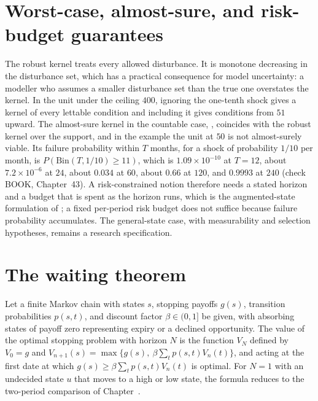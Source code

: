 \section{Worst-case, almost-sure, and risk-budget guarantees}

The robust kernel treats every allowed disturbance. It is monotone decreasing in the disturbance set, which has a practical consequence for model uncertainty: a modeller who assumes a smaller disturbance set than the true one overstates the kernel. In the unit under the ceiling $400$, ignoring the one-tenth shock gives a kernel of every lettable condition and including it gives conditions from $51$ upward. The almost-sure kernel in the countable case, , coincides with the robust kernel over the support, and in the example the unit at $50$ is not almost-surely viable. Its failure probability within $T$ months, for a shock of probability $1/10$ per month, is $P(\mathrm{Bin}(T,1/10)\ge 11)$, which is $1.09\times 10^{-10}$ at $T=12$, about $7.2\times 10^{-6}$ at $24$, about $0.034$ at $60$, about $0.66$ at $120$, and $0.9993$ at $240$ (check BOOK, Chapter~43). A risk-constrained notion therefore needs a stated horizon and a budget that is spent as the horizon runs, which is the augmented-state formulation of ; a fixed per-period risk budget does not suffice because failure probability accumulates. The general-state case, with measurability and selection hypotheses, remains a research specification.

\section{The waiting theorem}

\begin{theorem}\label{thm:wait}
Let a finite Markov chain with states $s$, stopping payoffs $g(s)$, transition probabilities $p(s,t)$, and discount factor $\beta\in(0,1]$ be given, with absorbing states of payoff zero representing expiry or a declined opportunity. The value of the optimal stopping problem with horizon $N$ is the function $V_N$ defined by $V_0=g$ and $V_{n+1}(s)=\max\{g(s),\ \beta\sum_tp(s,t)V_n(t)\}$, and acting at the first date at which $g(s)\ge\beta\sum_tp(s,t)V_n(t)$ is optimal. For $N=1$ with an undecided state $u$ that moves to a high or low state, the formula reduces to the two-period comparison of Chapter~.
\end{theorem}

